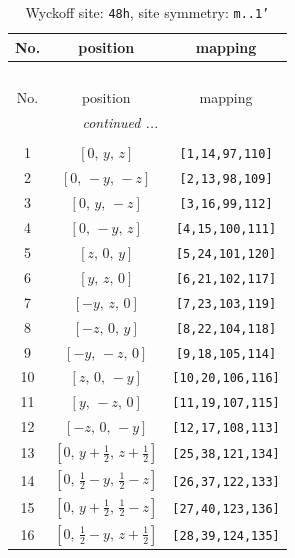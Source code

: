 \documentclass[fleqn,8pt]{jsarticle}
\begin{document}
\begin{longtable}{ccc}
\caption{Wyckoff site: {\tt 48h}, site symmetry: {\tt m..1'}}
 \\
 \hline \hline
No. & position & mapping \\ \hline \endfirsthead

\multicolumn{2}{l}{\tablename\ \thetable{}} \\
 \hline \hline
No. & position & mapping \\ \hline \endhead

 \hline \hline
\multicolumn{2}{r}{\footnotesize\it continued ...} \\ \endfoot

 \hline \hline
\multicolumn{2}{r}{} \\ \endlastfoot

1 & $\left[ 0,\, y,\, z \right]$ & {\tt [1,14,97,110]} \\ \hline
2 & $\left[ 0,\, - y,\, - z \right]$ & {\tt [2,13,98,109]} \\ \hline
3 & $\left[ 0,\, y,\, - z \right]$ & {\tt [3,16,99,112]} \\ \hline
4 & $\left[ 0,\, - y,\, z \right]$ & {\tt [4,15,100,111]} \\ \hline
5 & $\left[ z,\, 0,\, y \right]$ & {\tt [5,24,101,120]} \\ \hline
6 & $\left[ y,\, z,\, 0 \right]$ & {\tt [6,21,102,117]} \\ \hline
7 & $\left[ - y,\, z,\, 0 \right]$ & {\tt [7,23,103,119]} \\ \hline
8 & $\left[ - z,\, 0,\, y \right]$ & {\tt [8,22,104,118]} \\ \hline
9 & $\left[ - y,\, - z,\, 0 \right]$ & {\tt [9,18,105,114]} \\ \hline
10 & $\left[ z,\, 0,\, - y \right]$ & {\tt [10,20,106,116]} \\ \hline
11 & $\left[ y,\, - z,\, 0 \right]$ & {\tt [11,19,107,115]} \\ \hline
12 & $\left[ - z,\, 0,\, - y \right]$ & {\tt [12,17,108,113]} \\ \hline
13 & $\left[ 0,\, y + \frac{1}{2},\, z + \frac{1}{2} \right]$ & {\tt [25,38,121,134]} \\ \hline
14 & $\left[ 0,\, \frac{1}{2} - y,\, \frac{1}{2} - z \right]$ & {\tt [26,37,122,133]} \\ \hline
15 & $\left[ 0,\, y + \frac{1}{2},\, \frac{1}{2} - z \right]$ & {\tt [27,40,123,136]} \\ \hline
16 & $\left[ 0,\, \frac{1}{2} - y,\, z + \frac{1}{2} \right]$ & {\tt [28,39,124,135]} \\ \hline

\end{longtable}
\end{document}
